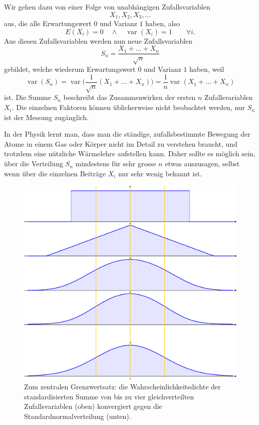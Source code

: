 Wir gehen dazu von einer Folge von unabhängigen Zufallsvariablen
\[
X_1,X_2,X_3,\dots
\]
aus, die alle Erwartungswert $0$ und Varianz $1$ haben, also
\[
E(X_i)=0\quad\wedge\quad\operatorname{var}(X_i)=1\qquad\forall i.
\]
Aus diesen Zufallsvariablen werden nun neue Zufallsvariablen
\[
S_n=\frac{X_1+\dots+X_n}{\sqrt{n}}
\]
gebildet, welche wiederum Erwartungswert $0$ und Varianz $1$ haben,
weil
\[
\operatorname{var}(S_n)=\operatorname{var}\bigl(\frac1{\sqrt{n}}(X_1+\dots+X_n)\big)
=\frac1n\operatorname{var}(X_1+\dots+X_n)
\]
ist.
Die Summe $S_n$ beschreibt das Zusammenwirken der ersten $n$
Zufallsvariablen $X_i$.
Die einzelnen Faktoren können üblicherweise
nicht beobachtet werden, nur $S_n$ ist der Messung zugänglich.

In der Physik lernt man, dass man die ständige, zufallsbestimmte
Bewegung der Atome in einem Gas oder Körper nicht im Detail
zu verstehen braucht, und trotzdem eine nützliche Wärmelehre
aufstellen kann.
Daher sollte es möglich sein, über die Verteilung
$S_n$ mindestens für sehr grosse $n$ etwas auszusagen, selbst
wenn über die einzelnen Beiträge $X_i$ nur sehr wenig bekannt ist.
\begin{figure}
\begin{center}
\includegraphics[width=\hsize]{images/verteilungsfunktion-10}
\end{center}
\caption{Zum zentralen Grenzwertsatz: die Wahrscheinlichkeitsdichte
der standardisierten Summe von bis zu vier 
gleichverteilten Zufallsvariablen (oben)
konvergiert gegen die Standardnormalverteilung (unten).\label{zgws}}
\end{figure}

